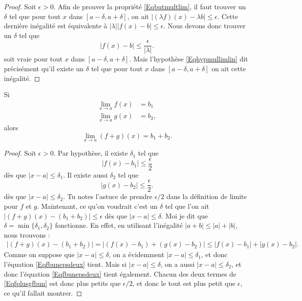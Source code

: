 \begin{proof}
Soit $\epsilon>0$. Afin de prouver la propriété \eqref{Eqbutmultlim}, il faut trouver un $\delta$ tel que pour tout $x$ dans $[a-\delta,a+\delta]$, on ait $| (\lambda f)(x)- \lambda b |\leq\epsilon$. Cette dernière inégalité est équivalente à $|\lambda|| f(x)-b |\leq\epsilon$. Nous devons donc trouver un $\delta$ tel que
\begin{equation}
| f(x)-b |\leq\frac{ \epsilon }{ | \lambda | }.
\end{equation}
soit vraie pour tout $x$ dans $[a-\delta,a+\delta]$. Mais l'hypothèse \eqref{Eqhypmullimlin} dit précisément qu'il existe un $\delta$ tel que pour tout $x$ dans $[a-\delta,a+\delta]$ on ait cette inégalité.
\end{proof}

\begin{theorem}     \label{ThoLimLin}
    Si
    \begin{subequations}
    \begin{align}
        \lim_{x\to a}f(x)&=b_1\\
        \lim_{x\to a}g(x)&=b_2,
    \end{align}
    \end{subequations}
    alors
    \begin{equation}
        \lim_{x\to a}(f+g)(x)=b_1+b_2.
    \end{equation}
\end{theorem}

\begin{proof}
    Soit $\epsilon>0$. Par hypothèse, il existe $\delta_1$ tel que
    \begin{equation}    \label{Eqfbunepsdeux}
      | f(x)-b_1 |\leq \frac{ \epsilon }{ 2 }
    \end{equation}
    dès que $| x-a |\leq\delta_1$. Il existe aussi $\delta_2$ tel que
    \begin{equation}    \label{Eqgbdeuxepsdeux}
      | g(x)-b_2 |\leq \frac{ \epsilon }{ 2 }.
    \end{equation}
    dès que $| x-a |\leq \delta_2$. Tu notes l'astuce de prendre $\epsilon/2$ dans la définition de limite pour $f$ et $g$. Maintenant, ce qu'on voudrait c'est un $\delta$ tel que l'on ait $| (f+g)(x)-(b_1+b_2) |\leq \epsilon$ dès que $| x-a |\leq \delta$. Moi je dit que $\delta=\min\{ \delta_1,\delta_2 \}$ fonctionne. En effet, en utilisant l'inégalité $| a+b |\leq | a |+| b |$, nous trouvons :
    \begin{align}
    | (f+g)(x)-(b_1+b_2) |=| (f(x)-b_1)+(g(x)-b_2) |
            \leq | f(x)-b_1 |+| g(x)-b_2 |.     \label{Eqfplusgfbun}
    \end{align}
    Comme on suppose que $| x-a |\leq\delta$, on a évidemment $| x-a |\leq\delta_1$, et donc l'équation \eqref{Eqfbunepsdeux} tient. Mais si $| x-a |\leq\delta$, on a aussi $| x-a |\leq\delta_2$, et donc l'équation  \eqref{Eqfbunepsdeux} tient également. Chacun des deux termes de \eqref{Eqfplusgfbun} est donc plus petits que $\epsilon/2$, et donc le tout est plus petit que $\epsilon$, ce qu'il fallait montrer.
\end{proof}

